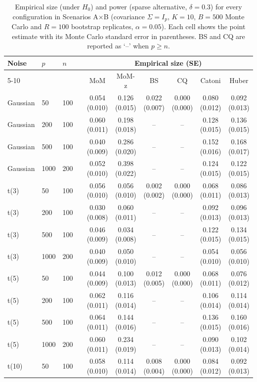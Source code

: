 \begin{table}[t]
\centering\small
\caption{Empirical size (under $H_0$) and power (sparse alternative, $\delta=0.3$) for every configuration in Scenarios A$\times$B (covariance $\Sigma=I_p$, $K=10$, $B=500$ Monte Carlo and $R=100$ bootstrap replicates, $\alpha=0.05$). Each cell shows the point estimate with its Monte Carlo standard error in parentheses. BS and CQ are reported as `--' when $p\ge n$.}
\label{tab:main}
\begin{tabular}{llllcccccc}
\toprule
Noise & $p$ & $n$ & & \multicolumn{6}{c}{Empirical size (SE)} \\
\cmidrule{5-10}
 & & & & MoM & MoM-z & BS & CQ & Catoni & Huber \\
\midrule
Gaussian & 50 & 100 & & 0.054 (0.010) & 0.126 (0.015) & 0.022 (0.007) & 0.000 (0.000) & 0.080 (0.012) & 0.092 (0.013) \\
Gaussian & 200 & 100 & & 0.060 (0.011) & 0.198 (0.018) & -- & -- & 0.128 (0.015) & 0.136 (0.015) \\
Gaussian & 500 & 100 & & 0.040 (0.009) & 0.286 (0.020) & -- & -- & 0.152 (0.016) & 0.168 (0.017) \\
Gaussian & 1000 & 200 & & 0.052 (0.010) & 0.398 (0.022) & -- & -- & 0.124 (0.015) & 0.122 (0.015) \\
t(3) & 50 & 100 & & 0.056 (0.010) & 0.056 (0.010) & 0.002 (0.002) & 0.000 (0.000) & 0.068 (0.011) & 0.086 (0.013) \\
t(3) & 200 & 100 & & 0.030 (0.008) & 0.060 (0.011) & -- & -- & 0.092 (0.013) & 0.096 (0.013) \\
t(3) & 500 & 100 & & 0.046 (0.009) & 0.034 (0.008) & -- & -- & 0.122 (0.015) & 0.134 (0.015) \\
t(3) & 1000 & 200 & & 0.040 (0.009) & 0.050 (0.010) & -- & -- & 0.054 (0.010) & 0.056 (0.010) \\
t(5) & 50 & 100 & & 0.044 (0.009) & 0.100 (0.013) & 0.012 (0.005) & 0.000 (0.000) & 0.068 (0.011) & 0.076 (0.012) \\
t(5) & 200 & 100 & & 0.062 (0.011) & 0.116 (0.014) & -- & -- & 0.106 (0.014) & 0.114 (0.014) \\
t(5) & 500 & 100 & & 0.064 (0.011) & 0.144 (0.016) & -- & -- & 0.136 (0.015) & 0.160 (0.016) \\
t(5) & 1000 & 200 & & 0.060 (0.011) & 0.234 (0.019) & -- & -- & 0.090 (0.013) & 0.102 (0.014) \\
t(10) & 50 & 100 & & 0.058 (0.010) & 0.114 (0.014) & 0.008 (0.004) & 0.000 (0.000) & 0.084 (0.012) & 0.092 (0.013) \\

\end{tabular}
\end{table}
